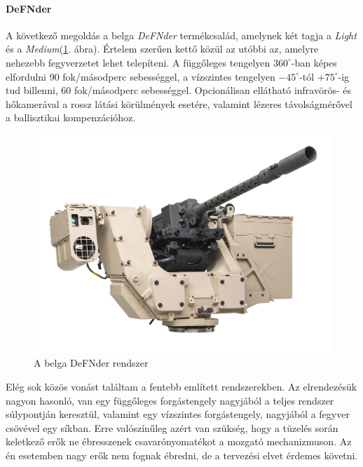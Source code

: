 \documentclass[12pt,a4paper]{article}
\begin{document}
\paragraph{DeFNder \cite{defnder}}
A következő megoldás a belga \textsl{DeFNder} termékcsalád, amelynek két tagja a \textsl{Light} és a \textsl{Medium}(\ref{fig:irod_defnder}. ábra). Értelem szerűen kettő közül az utóbbi az, amelyre nehezebb fegyverzetet lehet telepíteni. A függőleges tengelyen $360^\circ$-ban képes elfordulni 90 fok/másodperc sebességgel, a vízszintes tengelyen $-45^{\circ}$-tól $+75^{\circ}$-ig tud billenni, 60 fok/másodperc sebességgel. Opcionálisan ellátható infravörös- és hőkamerával a rossz látási körülmények esetére, valamint lézeres távolságmérővel a ballisztikai kompenzációhoz.
\begin{figure}[h!]
	\centering
	\includegraphics[width=1\linewidth]{irod_defnder}
	\caption{A belga DeFNder rendszer}
	\label{fig:irod_defnder}
\end{figure}

Elég sok közös vonást találtam a fentebb említett rendszerekben. Az elrendezésük nagyon hasonló, van egy függőleges forgástengely nagyjából a teljes rendszer súlypontján keresztül, valamint egy vízszintes forgástengely, nagyjából a fegyver csövével egy síkban. Erre valószínűleg azért van szükség, hogy a tüzelés során keletkező erők ne ébresszenek csavarónyomatékot a mozgató mechanizmuson. Az én esetemben nagy erők nem fognak ébredni, de a tervezési elvet érdemes követni.
\end{document}

